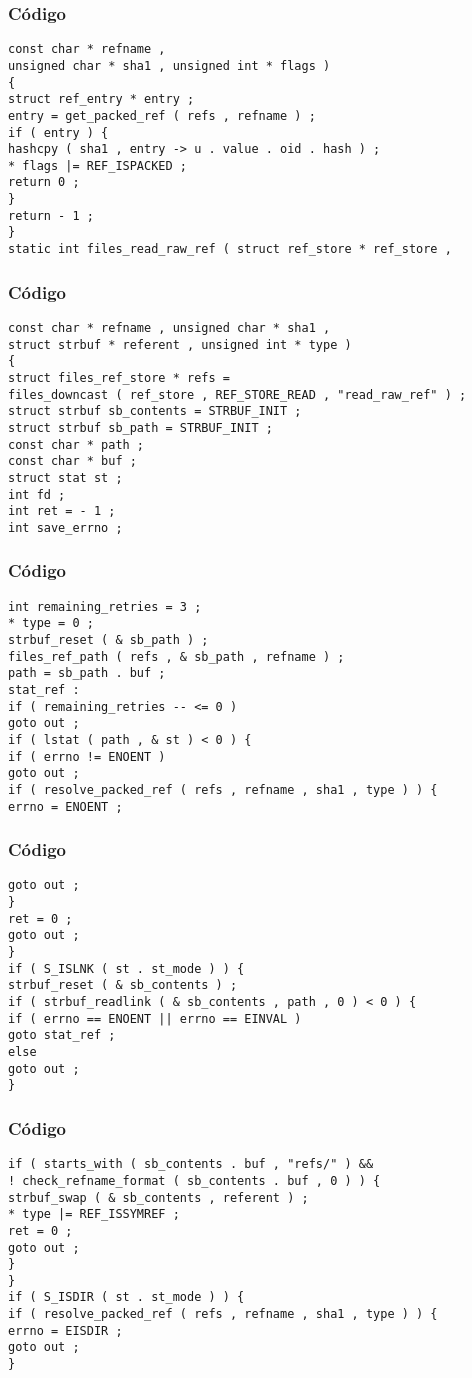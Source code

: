 \documentclass{beamer}
\begin{document}
\begin{frame}[fragile]
\frametitle{C\'odigo}
\begin{verbatim}
const char * refname , 
unsigned char * sha1 , unsigned int * flags ) 
{ 
struct ref_entry * entry ; 
entry = get_packed_ref ( refs , refname ) ; 
if ( entry ) { 
hashcpy ( sha1 , entry -> u . value . oid . hash ) ; 
* flags |= REF_ISPACKED ; 
return 0 ; 
} 
return - 1 ; 
} 
static int files_read_raw_ref ( struct ref_store * ref_store , 
\end{verbatim}
\end{frame}
\begin{frame}[fragile]
\frametitle{C\'odigo}
\begin{verbatim}
const char * refname , unsigned char * sha1 , 
struct strbuf * referent , unsigned int * type ) 
{ 
struct files_ref_store * refs = 
files_downcast ( ref_store , REF_STORE_READ , "read_raw_ref" ) ; 
struct strbuf sb_contents = STRBUF_INIT ; 
struct strbuf sb_path = STRBUF_INIT ; 
const char * path ; 
const char * buf ; 
struct stat st ; 
int fd ; 
int ret = - 1 ; 
int save_errno ; 
\end{verbatim}
\end{frame}
\begin{frame}[fragile]
\frametitle{C\'odigo}
\begin{verbatim}
int remaining_retries = 3 ; 
* type = 0 ; 
strbuf_reset ( & sb_path ) ; 
files_ref_path ( refs , & sb_path , refname ) ; 
path = sb_path . buf ; 
stat_ref : 
if ( remaining_retries -- <= 0 ) 
goto out ; 
if ( lstat ( path , & st ) < 0 ) { 
if ( errno != ENOENT ) 
goto out ; 
if ( resolve_packed_ref ( refs , refname , sha1 , type ) ) { 
errno = ENOENT ; 
\end{verbatim}
\end{frame}
\begin{frame}[fragile]
\frametitle{C\'odigo}
\begin{verbatim}
goto out ; 
} 
ret = 0 ; 
goto out ; 
} 
if ( S_ISLNK ( st . st_mode ) ) { 
strbuf_reset ( & sb_contents ) ; 
if ( strbuf_readlink ( & sb_contents , path , 0 ) < 0 ) { 
if ( errno == ENOENT || errno == EINVAL ) 
goto stat_ref ; 
else 
goto out ; 
} 
\end{verbatim}
\end{frame}
\begin{frame}[fragile]
\frametitle{C\'odigo}
\begin{verbatim}
if ( starts_with ( sb_contents . buf , "refs/" ) && 
! check_refname_format ( sb_contents . buf , 0 ) ) { 
strbuf_swap ( & sb_contents , referent ) ; 
* type |= REF_ISSYMREF ; 
ret = 0 ; 
goto out ; 
} 
} 
if ( S_ISDIR ( st . st_mode ) ) { 
if ( resolve_packed_ref ( refs , refname , sha1 , type ) ) { 
errno = EISDIR ; 
goto out ; 
} 
\end{verbatim}
\end{frame}
\end{document}
